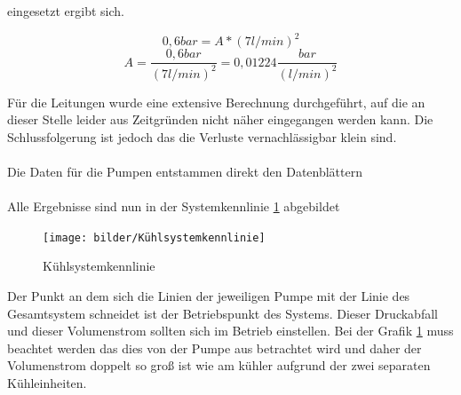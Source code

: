 eingesetzt ergibt sich.

\begin{equation}
	0,6 bar = A * (7 l/min)^2  
\end{equation}
\begin{equation}
	A = \dfrac{0,6 bar}{(7 l/min)^2 }
	  = 0,01224 \dfrac{bar}{(l/min)^2}
\end{equation}

Für die Leitungen wurde eine extensive Berechnung durchgeführt, auf die an dieser Stelle leider aus Zeitgründen nicht näher eingegangen werden kann. Die Schlussfolgerung ist jedoch das die Verluste vernachlässigbar klein sind. \\
\\
Die Daten für die Pumpen entstammen direkt den Datenblättern\\
\\
Alle Ergebnisse sind nun in der Systemkennlinie \ref{fig:kuhlsystemkennlinie} abgebildet

\begin{figure}[h]
	\centering
	\texttt{[image: bilder/Kühlsystemkennlinie]}
	\caption{Kühlsystemkennlinie}
	\label{fig:kuhlsystemkennlinie}
\end{figure}

Der Punkt an dem sich die Linien der jeweiligen Pumpe mit der Linie des Gesamtsystem schneidet ist der Betriebspunkt des Systems. Dieser Druckabfall und dieser Volumenstrom sollten sich im Betrieb einstellen. Bei der Grafik \ref{fig:kuhlsystemkennlinie} muss beachtet werden das dies von der Pumpe aus betrachtet wird und daher der Volumenstrom doppelt so groß ist wie am kühler aufgrund der zwei separaten Kühleinheiten.

\FloatBarrier

